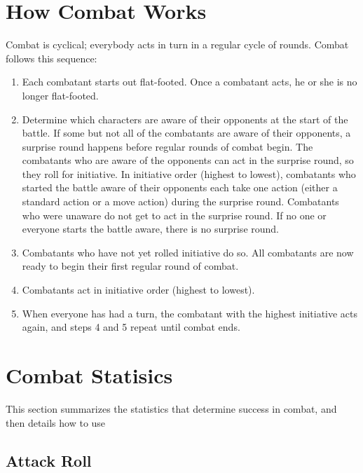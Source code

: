 \section{How Combat Works}

Combat is cyclical; everybody acts in turn in a regular cycle of rounds. Combat 
follows this sequence:

\begin{enumerate}
\item Each combatant starts out flat-footed. Once a combatant acts, he or she is no 
longer flat-footed.
\item Determine which characters are aware of their opponents at the start of the 
battle. If some but not all of the combatants are aware of their opponents, a surprise 
round happens before regular rounds of combat begin. The combatants who are aware 
of the opponents can act in the surprise round, so they roll for initiative. In 
initiative order (highest to lowest), combatants who started the battle aware of 
their opponents each take one action (either a standard action or a move action) 
during the surprise round. Combatants who were unaware do not get to act in the 
surprise round. If no one or everyone starts the battle aware, there is no surprise 
round.
\item Combatants who have not yet rolled initiative do so. All combatants are now 
ready to begin their first regular round of combat.
\item Combatants act in initiative order (highest to lowest).
\item When everyone has had a turn, the combatant with the highest initiative acts 
again, and steps 4 and 5 repeat until combat ends.
\end{enumerate}

\section{Combat Statisics}

This section summarizes the statistics that determine success in combat, and then 
details how to use

\subsection{Attack Roll}

